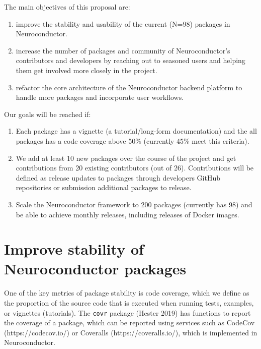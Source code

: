 \documentclass[]{elsarticle} %
\providecommand{\tightlist}{%
  \setlength{\itemsep}{0pt}\setlength{\parskip}{0pt}}
\begin{document}
The main objectives of this proposal are:

\begin{enumerate}
\def\labelenumi{\arabic{enumi}.}
\tightlist
\item
  improve the stability and usability of the current (N=98) packages in Neuroconductor.
\item
  increase the number of packages and community of Neuroconductor's contributors and developers by reaching out to seasoned users and helping them get involved more closely in the project.
\item
  refactor the core architecture of the Neuroconductor backend platform to handle more packages and incorporate user workflows.
\end{enumerate}

Our goals will be reached if:

\begin{enumerate}
\def\labelenumi{\arabic{enumi}.}
\tightlist
\item
  Each package has a vignette (a tutorial/long-form documentation) and the all packages has a code coverage above 50\% (currently 45\% meet this criteria).
\item
  We add at least 10 new packages over the course of the project and get contributions from 20 existing contributors (out of 26). Contributions will be defined as release updates to packages through developers GitHub repositories or submission additional packages to release.
\item
  Scale the Neuroconductor framework to 200 packages (currently has 98) and be able to achieve monthly releases, including releases of Docker images.
\end{enumerate}

\hypertarget{improve-stability-of-neuroconductor-packages}{%
\section{Improve stability of Neuroconductor packages}\label{improve-stability-of-neuroconductor-packages}}

One of the key metrics of package stability is code coverage, which we define as the proportion of the source code that is executed when running tests, examples, or vignettes (tutorials). The \texttt{covr} package (Hester 2019) has functions to report the coverage of a package, which can be reported using services such as CodeCov (https://codecov.io/) or Coveralls (https://coveralls.io/), which is implemented in Neuroconductor.
\end{document}

